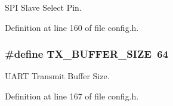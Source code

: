 S\-P\-I Slave Select Pin. 



Definition at line 160 of file config.\-h.

\hypertarget{group__config_ga9ab33647617098646990fe263600b650}{
\subsubsection[{T\-X\-\_\-\-B\-U\-F\-F\-E\-R\-\_\-\-S\-I\-Z\-E}]{\setlength{\rightskip}{0pt plus 5cm}\#define T\-X\-\_\-\-B\-U\-F\-F\-E\-R\-\_\-\-S\-I\-Z\-E~64}}\label{group__config_ga9ab33647617098646990fe263600b650}


U\-A\-R\-T Transmit Buffer Size. 



Definition at line 167 of file config.\-h.

